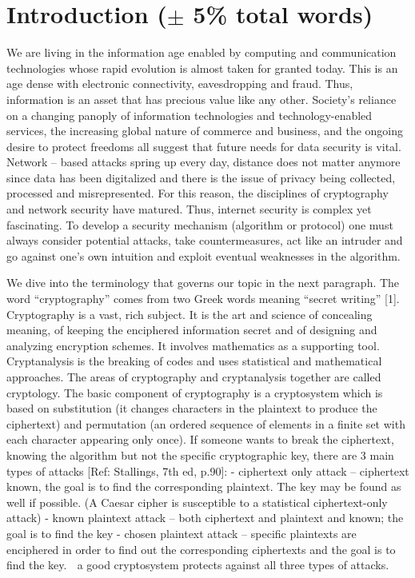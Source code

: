 \section{Introduction ($\pm$ 5\% total words)}
We are living in the information age enabled by computing and communication technologies whose rapid evolution is almost taken for granted today. This is an age dense with electronic connectivity, eavesdropping and fraud. Thus, information is an asset that has precious value like any other. Society’s reliance on a changing panoply of information technologies and technology-enabled services, the increasing global nature of commerce and business, and the ongoing desire to protect freedoms all suggest that future needs for data security is vital.  Network – based attacks spring up every day, distance does not matter anymore since data has been digitalized and there is the issue of privacy being collected, processed and misrepresented. For this reason, the disciplines of cryptography and network security have matured. Thus, internet security is complex yet fascinating. To develop a security mechanism (algorithm or protocol) one must always consider potential attacks, take countermeasures, act like an intruder and go against one’s own intuition and exploit eventual weaknesses in the algorithm. 

We dive into the terminology that governs our topic in the next paragraph. The word “cryptography” comes from two Greek words meaning “secret writing” [1]. Cryptography is a vast, rich subject. It is the art and science of concealing meaning, of keeping the enciphered information secret and of designing and analyzing encryption schemes. It involves mathematics as a supporting tool. Cryptanalysis is the breaking of codes and uses statistical and mathematical approaches. The areas of cryptography and cryptanalysis together are called cryptology. The basic component of cryptography is a cryptosystem which is based on substitution (it changes characters in the plaintext to produce the ciphertext) and permutation (an ordered sequence of elements in a finite set with each character appearing only once).
If someone wants to break the ciphertext, knowing the algorithm but not the specific cryptographic key,  there are 3 main types of attacks [Ref: Stallings, 7th ed, p.90]: 
-	ciphertext only attack – ciphertext known, the goal is to find the corresponding plaintext. The key may be found as well if possible. (A Caesar cipher is susceptible to a statistical ciphertext-only attack)
-	known plaintext attack – both ciphertext and plaintext and known; the goal is to find the key
-	chosen plaintext attack – specific plaintexts are enciphered in order to find out the corresponding ciphertexts and the goal is to find the key.
	a good cryptosystem protects against all three types of attacks. 

